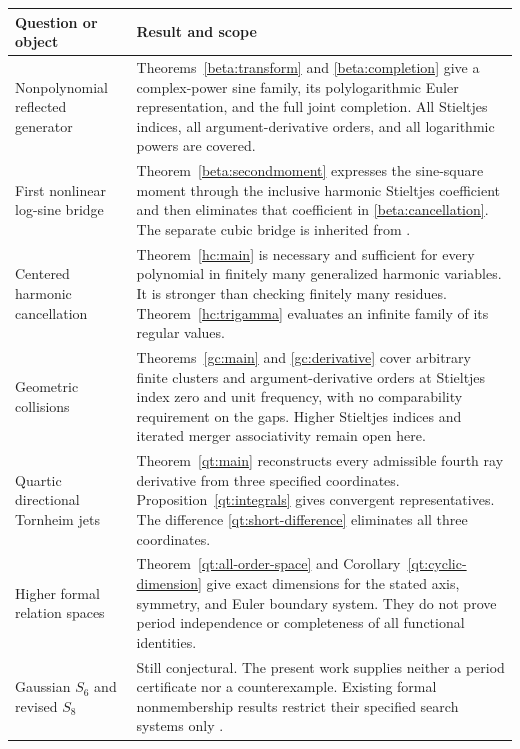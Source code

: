 \documentclass[11pt]{article}
\numberwithin{equation}{section}
\theoremstyle{definition}
\theoremstyle{remark}
\begin{document}
\begin{longtable}{>{\raggedright\arraybackslash}p{}p{}}
\toprule
Question or object & Result and scope\\
\midrule
\endhead
Nonpolynomial reflected generator &
Theorems~\ref{beta:transform} and \ref{beta:completion} give a
complex-power sine family, its polylogarithmic Euler representation, and
the full joint completion. All Stieltjes indices, all argument-derivative
orders, and all logarithmic powers are covered.\\[5pt]
First nonlinear log-sine bridge &
Theorem~\ref{beta:secondmoment} expresses the sine-square moment through
the inclusive harmonic Stieltjes coefficient and then eliminates that
coefficient in \eqref{beta:cancellation}. The separate cubic bridge is
inherited from \cite{RepoCubic}.\\[5pt]
Centered harmonic cancellation &
Theorem~\ref{hc:main} is necessary and sufficient for every polynomial
in finitely many generalized harmonic variables. It is stronger than
checking finitely many residues. Theorem~\ref{hc:trigamma} evaluates an
infinite family of its regular values.\\[5pt]
Geometric collisions &
Theorems~\ref{gc:main} and \ref{gc:derivative} cover arbitrary finite
clusters and argument-derivative orders at Stieltjes index zero and unit
frequency, with no comparability requirement on the gaps. Higher
Stieltjes indices and iterated merger associativity remain open here.\\[5pt]
Quartic directional Tornheim jets &
Theorem~\ref{qt:main} reconstructs every admissible fourth ray derivative
from three specified coordinates. Proposition~\ref{qt:integrals} gives
convergent representatives. The difference \eqref{qt:short-difference}
eliminates all three coordinates.\\[5pt]
Higher formal relation spaces &
Theorem~\ref{qt:all-order-space} and
Corollary~\ref{qt:cyclic-dimension} give exact dimensions for the stated
axis, symmetry, and Euler boundary system. They do not prove period
independence or completeness of all functional identities.\\[5pt]
Gaussian $S_6$ and revised $S_8$ &
Still conjectural. The present work supplies neither a period certificate
nor a counterexample. Existing formal nonmembership results restrict
their specified search systems only \cite{RepoExact}.\\
\bottomrule
\end{longtable}
\end{document}
